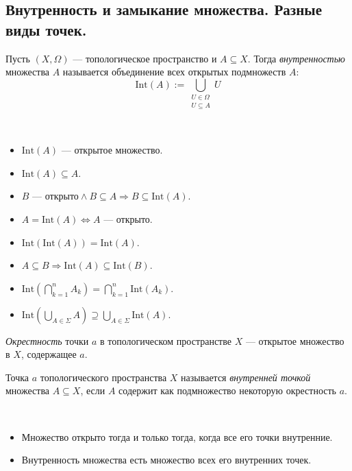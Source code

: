 \documentclass[12pt,a4paper]{article}
\newcommand{\Int}{\ensuremath{\mathrm{Int}}\xspace}
\begin{document}
    \subsection{Внутренность и замыкание множества. Разные виды точек.}

    \begin{definition}
        Пусть $(X, \Omega)$ --- топологическое пространство и $A \subseteq X$. Тогда \emph{внутренностью} множества $A$ называется
        объединение всех открытых подмножеств $A$:
        \[\Int(A) := \bigcup_{\substack{U \in \Omega\\U \subseteq A}} U\]
    \end{definition}

    \begin{theorem}\ 
        \begin{multicols}{2}
            \begin{itemize}
                \item $\Int(A)$ --- открытое множество.
                \item $\Int(A) \subseteq A$.
                \item $B\text{ --- открыто} \wedge B \subseteq A \Rightarrow B \subseteq \Int(A)$.
                \item $A = \Int(A) \Leftrightarrow A \text{ --- открыто}$.
                \item $\Int(\Int(A)) = \Int(A)$.
                \item $A \subseteq B \Rightarrow \Int(A) \subseteq \Int(B)$.
                \item $\Int(\bigcap_{k=1}^n A_k) = \bigcap_{k=1}^n \Int(A_k)$.
                \item $\Int(\bigcup_{A \in \Sigma} A) \supseteq \bigcup_{A \in \Sigma} \Int(A)$.
            \end{itemize}
        \end{multicols}
    \end{theorem}

    \begin{definition}
        \emph{Окрестность} точки $a$ в топологическом пространстве $X$ --- открытое множество в $X$, содержащее $a$.

        Точка $a$ топологического пространства $X$ называется \emph{внутренней точкой} множества $A \subseteq X$, если $A$ содержит как подмножество некоторую окрестность $a$.
    \end{definition}

    \begin{theorem}\ 
        \begin{itemize}
            \item Множество открыто тогда и только тогда, когда все его точки внутренние.
            \item Внутренность множества есть множество всех его внутренних точек.
        \end{itemize}
    \end{theorem}
\end{document}
